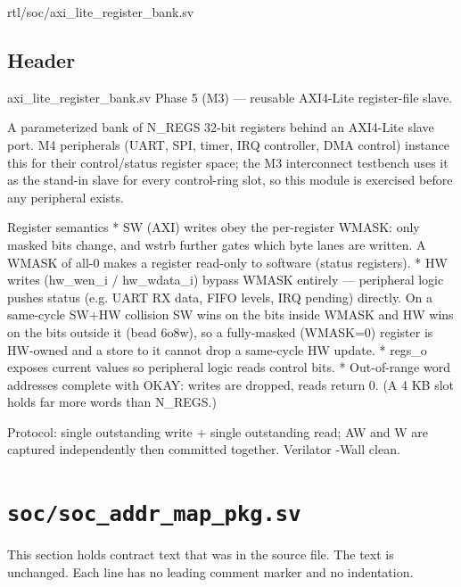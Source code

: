 \begin{relocated}{rtl/soc/axi_lite_register_bank.sv}

\subsection*{Header}

\begin{textblock}
axi_lite_register_bank.sv
Phase 5 (M3) — reusable AXI4-Lite register-file slave.

A parameterized bank of N_REGS 32-bit registers behind an AXI4-Lite slave
port.  M4 peripherals (UART, SPI, timer, IRQ controller, DMA control) instance
this for their control/status register space; the M3 interconnect testbench
uses it as the stand-in slave for every control-ring slot, so this module is
exercised before any peripheral exists.

Register semantics
  * SW (AXI) writes obey the per-register WMASK: only masked bits change, and
    wstrb further gates which byte lanes are written.  A WMASK of all-0 makes
    a register read-only to software (status registers).
  * HW writes (hw_wen_i / hw_wdata_i) bypass WMASK entirely — peripheral logic
    pushes status (e.g. UART RX data, FIFO levels, IRQ pending) directly.  On a
    same-cycle SW+HW collision SW wins on the bits inside WMASK and HW wins on the
    bits outside it (bead 6o8w), so a fully-masked (WMASK=0) register is HW-owned
    and a store to it cannot drop a same-cycle HW update.
  * regs_o exposes current values so peripheral logic reads control bits.
  * Out-of-range word addresses complete with OKAY: writes are dropped, reads
    return 0.  (A 4 KB slot holds far more words than N_REGS.)

Protocol: single outstanding write + single outstanding read; AW and W are
captured independently then committed together.  Verilator -Wall clean.
\end{textblock}

\end{relocated}

\section{\texttt{soc/soc\_addr\_map\_pkg.sv}}\label{ds:mod:soc-addr-map-pkg}

This section holds contract text that was in the source file. The text is unchanged. Each line has no leading comment marker and no indentation.

